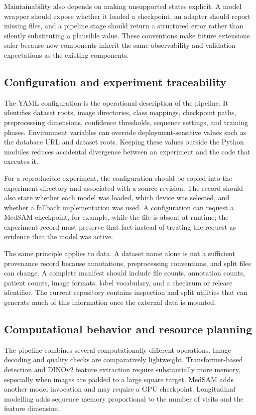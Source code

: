 \documentclass[12pt,a4paper]{article}
\begin{document}
Maintainability also depends on making unsupported states explicit. A model wrapper should expose whether it loaded a checkpoint, an adapter should report missing files, and a pipeline stage should return a structured error rather than silently substituting a plausible value. These conventions make future extensions safer because new components inherit the same observability and validation expectations as the existing components.

\subsection{Configuration and experiment traceability}
The YAML configuration is the operational description of the pipeline. It identifies dataset roots, image directories, class mappings, checkpoint paths, preprocessing dimensions, confidence thresholds, sequence settings, and training phases. Environment variables can override deployment-sensitive values such as the database URL and dataset roots. Keeping these values outside the Python modules reduces accidental divergence between an experiment and the code that executes it.

For a reproducible experiment, the configuration should be copied into the experiment directory and associated with a source revision. The record should also state whether each model was loaded, which device was selected, and whether a fallback implementation was used. A configuration can request a MedSAM checkpoint, for example, while the file is absent at runtime; the experiment record must preserve that fact instead of treating the request as evidence that the model was active.

The same principle applies to data. A dataset name alone is not a sufficient provenance record because annotations, preprocessing conventions, and split files can change. A complete manifest should include file counts, annotation counts, patient counts, image formats, label vocabulary, and a checksum or release identifier. The current repository contains inspection and split utilities that can generate much of this information once the external data is mounted.

\subsection{Computational behavior and resource planning}
The pipeline combines several computationally different operations. Image decoding and quality checks are comparatively lightweight. Transformer-based detection and DINOv2 feature extraction require substantially more memory, especially when images are padded to a large square target. MedSAM adds another model invocation and may require a GPU checkpoint. Longitudinal modelling adds sequence memory proportional to the number of visits and the feature dimension.
\end{document}
